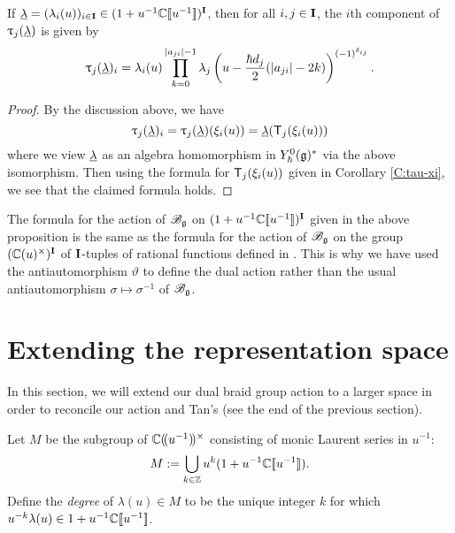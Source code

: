 \begin{proposition}\label{P:Tan-formula}
    If $\ul = (\lambda_i(u))_{i\in\I}\in (1+u^{-1}\C\db{u^{-1}})^\I$, then for all $i,j\in\I$, the $i$th component of $\braid_j(\ul)$ is given by
    \[\braid_j(\ul)_i = \lambda_i(u)\prod_{k=0}^{\abs{a_{ji}}-1}\lambda_j\left(u-\frac{\hbar d_j}{2}(\abs{a_{ji}}-2k)\right)^{(-1)^{\delta_{ij}}}.\]
\end{proposition}
\begin{proof}
    By the discussion above, we have
    \[\braid_j(\ul)_i = \braid_j(\ul)(\xi_i(u)) = \ul(\mbraid_j(\xi_i(u)))\]
    where we view $\ul$ as an algebra homomorphism in $\Yhg[0]^*$ via the above isomorphism.
    Then using the formula for $\mbraid_j(\xi_i(u))$ given in Corollary \ref{C:tau-xi}, we see that the claimed formula holds.
\end{proof}

The formula for the action of $\Bg$ on $(1+u^{-1}\C\db{u^{-1}})^\I$ given in the above proposition is the same as the formula for the action of $\Bg$ on the group $(\C(u)^\times)^\I$ of $\I$-tuples of rational functions defined in \cite[Prop. 3.1]{tan_braid_2015}.
This is why we have used the antiautomorphism $\vartheta$ to define the dual action rather than the usual antiautomorphism $\sigma\mapsto\sigma^{-1}$ of $\Bg$.


\section{Extending the representation space}\label{sec:extending}

In this section, we will extend our dual braid group action to a larger space in order to reconcile our action and Tan's (see the end of the previous section).

Let $M$ be the subgroup of $\C\dparen{u^{-1}}^\times$ consisting of monic Laurent series in $u^{-1}$:
\[M := \bigcup_{k\in\Z}u^{k}(1+u^{-1}\C\db{u^{-1}}).\]
Define the \emph{degree} of $\lambda(u)\in M$ to be the unique integer $k$ for which $u^{-k}\lambda(u)\in 1+u^{-1}\C\db{u^{-1}}$.

